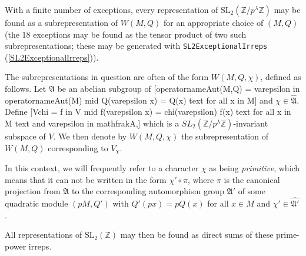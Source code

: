 \documentclass[a4paper,11pt]{report}
\begin{document}
{{ With a finite number of exceptions, every representation of $\mathrm{SL}_2(\mathbb{Z}/p^\lambda\mathbb{Z})$ may be found as a subrepresentation of $W(M,Q)$ for an appropriate choice of $(M,Q)$ \cite[Hauptsatz 2]{NW76} (the 18 exceptions may be found as the tensor product of two such
subrepresentations; these may be generated with \texttt{SL2ExceptionalIrreps} (\ref{SL2ExceptionalIrreps})). 

 The subrepresentations in question are often of the form $W(M,Q,\chi)$, defined as follows. Let $\mathfrak{A}$ be an abelian subgroup of
\texttt{}[\texttt{}operatorname\texttt{}Aut\texttt{}(M,Q)
= \texttt{}\texttt{} \texttt{}varepsilon
\texttt{}in
\texttt{}operatorname\texttt{}Aut\texttt{}(M)
\texttt{}mid Q(\texttt{}varepsilon x) = Q(x)
\texttt{}text\texttt{} for all \texttt{} x
\texttt{}in
M\texttt{}\texttt{}\texttt{}] and $\chi \in \hat{\mathfrak{A}}$. Define \texttt{}[V{\textunderscore}\texttt{}chi =
\texttt{}\texttt{}f \texttt{}in V
\texttt{}mid f(\texttt{}varepsilon x) =
\texttt{}chi(\texttt{}varepsilon) f(x)
\texttt{}text\texttt{} for all \texttt{} x
\texttt{}in M \texttt{}text\texttt{} and
\texttt{} \texttt{}varepsilon \texttt{}in
\texttt{}mathfrak\texttt{}A\texttt{}\texttt{}\texttt{}\texttt{},\texttt{}]
which is a $SL_2(\mathbb{Z}/p^\lambda\mathbb{Z})$-invariant subspace of $V$. We then denote by $W(M,Q,\chi)$ the subrepresentation of $W(M,Q)$ corresponding to $V_\chi$. 

 In this context, we will frequently refer to a character $\chi$ as being \emph{primitive}, which means that it can not be written in the form $\chi' \circ \pi$, where $\pi$ is the canonical projection from $\mathfrak{A}$ to the corresponding automorphism group $\mathfrak{A'}$ of some quadratic module $(pM,Q')$ with $Q'(px) = pQ(x)$ for all $x \in M$ and $\chi' \in \hat{\mathfrak{A}'}$. 

 All representations of $\mathrm{SL}_2(\mathbb{Z})$ may then be found as direct sums of these prime-power irreps. 

 }

}
\end{document}
